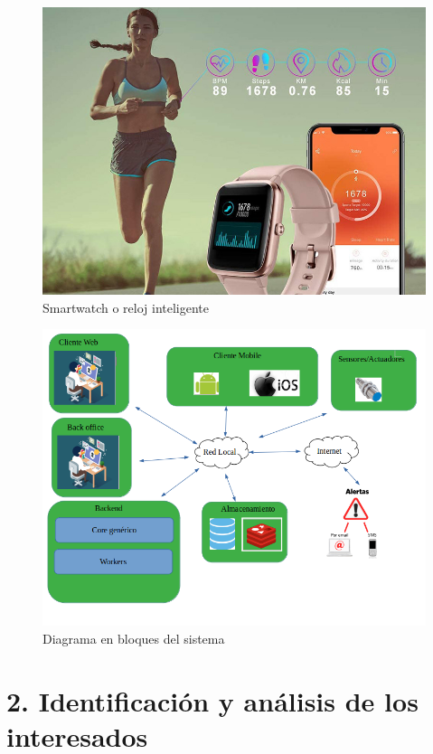 \documentclass[
11pt, %
]{charter}
\begin{document}
\begin{figure}[htpb]
\centering 
\includegraphics[width=.55\textwidth]{./Figuras/pulsera2.jpg}
\caption{Smartwatch o reloj inteligente}
\label{fig:pulsera_inteligente}
\end{figure}

\begin{figure}[htpb]
\centering 
\includegraphics[width=.8\textwidth]{./Figuras/iot_nico.png}
\caption{Diagrama en bloques del sistema}
\label{fig:diagBloques}
\end{figure}

\section{2. Identificación y análisis de los interesados}
\label{sec:interesados}
\end{document}
